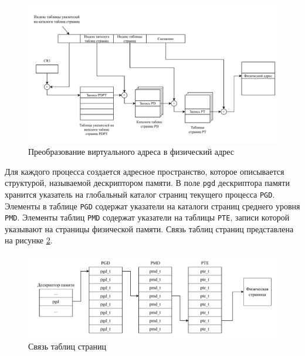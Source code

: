 \begin{figure}[H]
	\begin{center}
		\includegraphics[scale=0.75]{inc/img/transformation.pdf}
	\end{center}
	\captionsetup{justification=centering}
	\caption{Преобразование виртуального адреса в физический адрес}
	\label{img:address-translation}
\end{figure}
    
Для каждого процесса создается адресное пространство, которое описывается структурой, называемой дескриптором памяти. В поле \texttt{pgd} дескриптора памяти хранится указатель на глобальный каталог страниц текущего процесса \texttt{PGD}. Элементы в таблице \texttt{PGD} содержат указатели на каталоги страниц среднего уровня \texttt{PMD}. Элементы таблиц \texttt{PMD} содержат указатели на таблицы \texttt{PTE}, записи которой указывают на страницы физической памяти. Связь таблиц страниц представлена на рисунке \ref{img:page-tables}.

\begin{figure}[H]
	\begin{center}
		\includegraphics[scale=0.75]{inc/img/page-tables.pdf}
	\end{center}
	\captionsetup{justification=centering}
	\caption{Связь таблиц страниц}
	\label{img:page-tables}
\end{figure}

